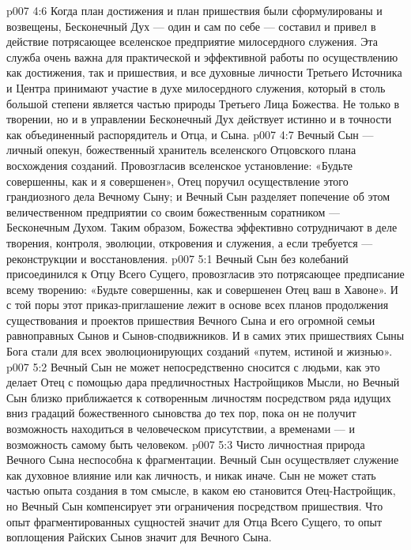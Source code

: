 \vs p007 4:6 \bibnobreakspace {} Когда план достижения и план пришествия были сформулированы и возвещены, Бесконечный Дух --- один и сам по себе --- составил и привел в действие потрясающее вселенское предприятие милосердного служения. Эта служба очень важна для практической и эффективной работы по осуществлению как достижения, так и пришествия, и все духовные личности Третьего Источника и Центра принимают участие в духе милосердного служения, который в столь большой степени является частью природы Третьего Лица Божества. Не только в творении, но и в управлении Бесконечный Дух действует истинно и в точности как объединенный распорядитель и Отца, и Сына.
\vs p007 4:7 \pc Вечный Сын --- личный опекун, божественный хранитель вселенского Отцовского плана восхождения созданий. Провозгласив вселенское установление: «Будьте совершенны, как и я совершенен», Отец поручил осуществление этого грандиозного дела Вечному Сыну; и Вечный Сын разделяет попечение об этом величественном предприятии со своим божественным соратником --- Бесконечным Духом. Таким образом, Божества эффективно сотрудничают в деле творения, контроля, эволюции, откровения и служения, а если требуется --- реконструкции и восстановления.
\vs p007 5:1 Вечный Сын без колебаний присоединился к Отцу Всего Сущего, провозгласив это потрясающее предписание всему творению: «Будьте совершенны, как и совершенен Отец ваш в Хавоне». И с той поры этот приказ\hyp{}приглашение лежит в основе всех планов продолжения существования и проектов пришествия Вечного Сына и его огромной семьи равноправных Сынов и Сынов\hyp{}сподвижников. И в самих этих пришествиях Сыны Бога стали для всех эволюционирующих созданий «путем, истиной и жизнью».
\vs p007 5:2 \pc Вечный Сын не может непосредственно сносится с людьми, как это делает Отец с помощью дара предличностных Настройщиков Мысли, но Вечный Сын близко приближается к сотворенным личностям посредством ряда идущих вниз градаций божественного сыновства до тех пор, пока он не получит возможность находиться в человеческом присутствии, а временами --- и возможность самому быть человеком.
\vs p007 5:3 Чисто личностная природа Вечного Сына неспособна к фрагментации. Вечный Сын осуществляет служение как духовное влияние или как личность, и никак иначе. Сын не может стать частью опыта создания в том смысле, в каком ею становится Отец\hyp{}Настройщик, но Вечный Сын компенсирует эти ограничения посредством пришествия. Что опыт фрагментированных сущностей значит для Отца Всего Сущего, то опыт воплощения Райских Сынов значит для Вечного Сына.
